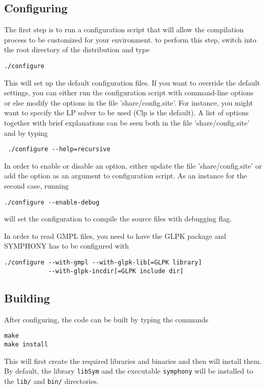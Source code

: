\subsection{Configuring}

The first step is to run a configuration script that will allow the
compilation process to be customized for your environment. to perform this
step, switch into the root directory of the distribution and type
\begin{verbatim}
./configure 
\end{verbatim}
This will set up the default configuration files. If you want to override the
default settings, you can either run the configuration script with
command-line options or else modify the options in the file
'share/config.site'. For instance, you might want to specify the LP solver to
be used (Clp is the default). A list of options together with brief
explanations can be seen both in the file 'share/config.site' and by typing
\begin{verbatim}
 ./configure --help=recursive 
\end{verbatim}
In order to enable or disable an option, either update the file 
'share/config.site' or add the option as an argument to configuration script. 
As an instance for the second case, running 
\begin{verbatim}
./configure --enable-debug
\end{verbatim}
will set the configuration to compile the source files with debugging
flag. 

In order to read GMPL files, you need to have the GLPK package and SYMPHONY
has to be configured with
\begin{verbatim}
./configure --with-gmpl --with-glpk-lib[=GLPK library] 
            --with-glpk-incdir[=GLPK include dir] 
\end{verbatim}

\subsection{Building}

After configuring, the code can be built by typing the commands
\begin{verbatim}
make
make install
\end{verbatim}
This will first create the required libraries and binaries and then will
install them. By default, the library \texttt{libSym} and the executable
\texttt{symphony} will be installed to the \texttt{lib/} and \texttt{bin/}
directories.

